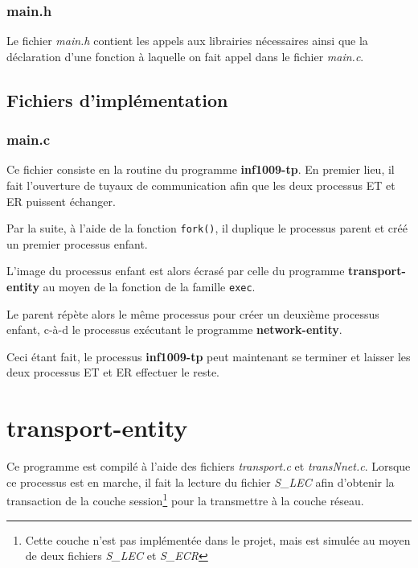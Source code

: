 \documentclass[11pt,french]{article}
\begin{document}
            \subsubsection{main.h} %
            \label{ssub:main.h}
                Le fichier \emph{main.h} contient les appels aux librairies nécessaires ainsi que la déclaration
                d'une fonction à laquelle on fait appel dans le fichier \emph{main.c}.
                
        \subsection{Fichiers d'implémentation} %
        \label{sub:fich-compiles-inf1009-tp}
        
        \subsubsection{main.c} %
        \label{ssub:main.c}
            Ce fichier consiste en la routine du programme {\bf inf1009-tp}. En premier lieu, il fait l'ouverture de tuyaux de communication
            afin que les deux processus ET et ER puissent échanger.
            

            Par la suite, à l'aide de la fonction \texttt{fork()}, il duplique le processus parent et créé un premier processus enfant.
            

            L'image du processus enfant est alors écrasé par celle du programme {\bf transport-entity} au moyen de la fonction de la famille
            \texttt{exec}.
            
            
            Le parent répète alors le même processus pour créer un deuxième processus enfant, c-à-d le processus exécutant le programme
            {\bf network-entity}.
            

            Ceci étant fait, le processus {\bf inf1009-tp} peut maintenant se terminer et laisser les deux processus ET et ER effectuer le reste.

    \section{transport-entity} %
    \label{sec:transport-entity}
        Ce programme est compilé à l'aide des fichiers \emph{transport.c} et \emph{transNnet.c}. Lorsque ce processus est en marche, il fait la lecture
        du fichier \emph{S\_LEC} afin d'obtenir la transaction de la couche session\footnote{Cette couche n'est pas implémentée dans le projet, mais est
        simulée au moyen de deux fichiers \emph{S\_LEC} et \emph{S\_ECR}} pour la transmettre à la couche réseau. 
\end{document}
